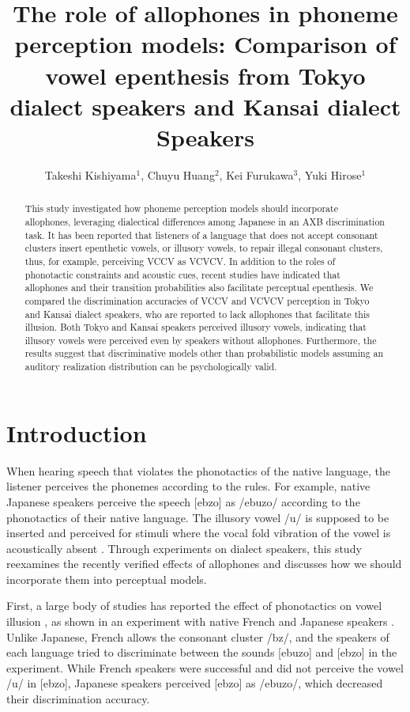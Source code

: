 \documentclass[a4paper,11pt,twocolumn]{article}
\title{The role of allophones in phoneme perception models: Comparison of vowel epenthesis from Tokyo dialect speakers and Kansai dialect Speakers}
\author{
    Takeshi Kishiyama$^1$,
    Chuyu Huang$^2$,
    Kei Furukawa$^3$,
    Yuki Hirose$^1$}
\begin{document}
\maketitle

\begin{abstract}
This study investigated how phoneme perception models should incorporate allophones, leveraging dialectical differences among Japanese in an AXB discrimination task. It has been reported that listeners of a language that does not accept consonant clusters insert epenthetic vowels, or illusory vowels, to repair illegal consonant clusters, thus, for example, perceiving VCCV as VCVCV. In addition to the roles of phonotactic constraints and acoustic cues, recent studies have indicated that allophones and their transition probabilities also facilitate perceptual epenthesis. We compared the discrimination accuracies of VCCV and VCVCV perception in Tokyo and Kansai dialect speakers, who are reported to lack allophones that facilitate this illusion. Both Tokyo and Kansai speakers perceived illusory vowels, indicating that illusory vowels were perceived even by speakers without allophones. Furthermore, the results suggest that discriminative models other than probabilistic models assuming an auditory realization distribution can be psychologically valid.
\end{abstract}


\section{Introduction}

When hearing speech that violates the phonotactics of the native language, the listener perceives the phonemes according to the rules. For example, native Japanese speakers perceive the speech [ebzo] as /ebuzo/ according to the phonotactics of their native language. The illusory vowel /u/ is supposed to be inserted and perceived for stimuli where the vocal fold vibration of the vowel is acoustically absent \cite{dupoux1999, dupoux2011}. Through experiments on dialect speakers, this study reexamines the recently verified effects of allophones and discusses how we should incorporate them into perceptual models.

First, a large body of studies has reported the effect of phonotactics on vowel illusion \cite{dupoux1993, korean, spanish, english, and others}, as shown in an experiment with native French and Japanese speakers \cite{dupoux1993}. Unlike Japanese, French allows the consonant cluster /bz/, and the speakers of each language tried to discriminate between the sounds [ebuzo] and [ebzo] in the experiment. While French speakers were successful and did not perceive the vowel /u/ in [ebzo], Japanese speakers perceived [ebzo] as /ebuzo/, which decreased their discrimination accuracy.
\end{document}
